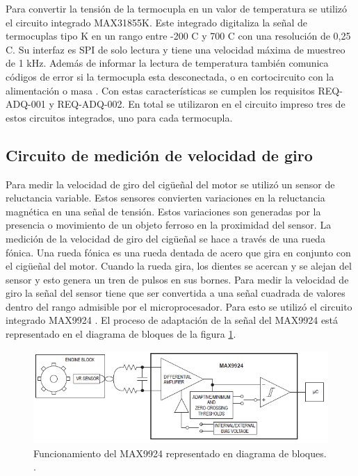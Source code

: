 Para convertir la tensión de la termocupla en un valor de temperatura se utilizó el circuito integrado MAX31855K. Este integrado digitaliza la señal de termocuplas tipo K en un rango entre -200 \degree C y 700 \degree C con una resolución de 0,25 \degree C. Su interfaz es SPI de solo lectura y tiene una velocidad máxima de muestreo de 1 kHz. Además de informar la lectura de temperatura también comunica códigos de error si la termocupla esta desconectada, o en cortocircuito con la alimentación o masa \cite{MAX31855}. Con estas características se cumplen los requisitos REQ-ADQ-001 y REQ-ADQ-002. En total se utilizaron en el circuito impreso tres de estos circuitos integrados, uno para cada termocupla.

\subsection{Circuito de medición de velocidad de giro}

Para medir la velocidad de giro del cigüeñal del motor se utilizó un sensor de reluctancia variable. Estos sensores convierten variaciones en la reluctancia magnética en una señal de tensión. Estos variaciones son generadas por la presencia o movimiento de un objeto ferroso en la proximidad del sensor. La medición de la velocidad de giro del cigüeñal se hace a través de una rueda fónica. Una rueda fónica es una rueda dentada de acero que gira en conjunto con el cigüeñal del motor. Cuando la rueda gira, los dientes se acercan y se alejan del sensor y esto genera un tren de pulsos en sus bornes. Para medir la velocidad de giro la señal del sensor tiene que ser convertida a una señal cuadrada de valores dentro del rango admisible por el microprocesador. Para esto se utilizó el circuito integrado MAX9924 \cite{MAX9924}. El proceso de adaptación de la señal del MAX9924 está representado en el diagrama de bloques de la figura \ref{fig:bloq-rpm}.

\begin{figure}[htpb]
\centering
\includegraphics[width=.9\textwidth]{./Figures/max9924.png}
\caption{Funcionamiento del MAX9924 representado en diagrama de bloques. \protect\footnotemark[3].}
\label{fig:bloq-rpm}
\end{figure}


